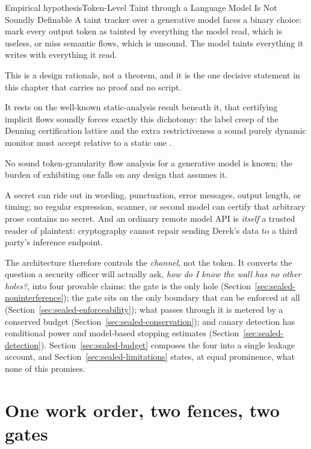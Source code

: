 \documentclass[11pt,a4paper]{article}
\theoremstyle{definition}
\begin{document}
\begin{pdclaim}{Empirical hypothesis}{Token-Level Taint through a Language Model Is Not Soundly Definable}
\setlength{\parskip}{4pt plus 1pt}
\label{hyp:sealed-taint}
A taint tracker over a generative model faces a binary choice: mark every
output token as tainted by everything the model read, which is useless, or
miss semantic flows, which is unsound. The model taints everything it writes
with everything it read.

This is a design rationale, not a theorem, and it is
the one decisive statement in this chapter that carries no proof and no
script.

It rests on the well-known static-analysis result beneath it, that
certifying implicit flows soundly forces exactly this dichotomy: the label
creep of the Denning certification lattice  and the extra
restrictiveness a sound purely dynamic monitor must accept relative to a static
one .

No sound token-granularity flow analysis for a generative model
is known; the burden of exhibiting one falls on any design that assumes it.
\end{pdclaim}

A secret can ride out in wording, punctuation, error messages, output length,
or timing; no regular expression, scanner, or second model can certify that
arbitrary prose contains no secret. And an ordinary remote model API is
\emph{itself} a trusted reader of plaintext: cryptography cannot repair
sending Derek's data to a third party's inference endpoint.

The architecture therefore controls the \emph{channel}, not the token. It
converts the question a security officer will actually ask, \emph{how do I know
the wall has no other holes?}, into four provable claims: the gate is the only
hole (Section~\ref{sec:sealed-noninterference}); the gate sits on the only
boundary that can be enforced at all
(Section~\ref{sec:sealed-enforceability}); what passes through it is metered by
a conserved budget (Section~\ref{sec:sealed-conservation}); and canary
detection has conditional power and model-based stopping estimates
(Section~\ref{sec:sealed-detection}). Section~\ref{sec:sealed-budget} composes
the four into a single leakage account, and
Section~\ref{sec:sealed-limitations} states, at equal prominence, what none of
this promises.

\section{One work order, two fences, two gates}\label{sec:sealed-design}
\end{document}
